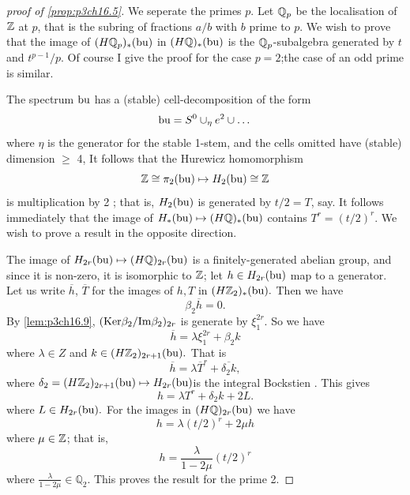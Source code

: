 \documentclass[../main]{subfiles}
\begin{document}
\begin{proof}[proof of \ref{prop:p3ch16.5}] We seperate the primes $p$. Let $\mathbb{Q}_p$ be the localisation of $\mathbb{Z}$ at $p$, that is the subring of fractions $a/b$ with $b$ prime to $p$. We wish to prove that the image of $(H\mathbb{Q}_{p})_{\ast}(\mathrm{bu})$ in $(H\mathbb{Q})_{\ast}(\mathrm{bu})$ is the $\mathbb{Q}_{p}$-subalgebra generated by $t$ and $t^{p-1}/p$. Of course I give the proof for the case $p=2$;the case of an odd prime is similar.

The spectrum $\mathrm{bu}$ has a (stable) cell-decomposition of the form \begin{equation*}
    \mathrm{bu}=S^{0}\cup_{\eta}e^{2}\cup\dots
\end{equation*}
where $\eta$ is the generator for the stable 1-stem, and the cells omitted have (stable) dimension $\geq$ 4, It follows that the Hurewicz homomorphism \begin{equation*}
    \mathbb{Z} \cong \pi_{2}(\mathrm{bu}) \mapsto H_{2}(\mathrm{bu}) \cong \mathbb{Z}
\end{equation*}
is multiplication by 2 ; that is, $H_{2}(\mathrm{bu})$ is generated by $t/2=T$, say. It follows immediately that the image of $H_{\ast}(\mathrm{bu}) \mapsto (H\mathbb{Q})_{\ast}(\mathrm{bu})$ contains $T^{r}=(t/2)^{r}.$ We wish to prove a result in the opposite direction.

The image of $H_{2r}(\mathrm{bu})\mapsto (H\mathbb{Q})_{2r}(\mathrm{bu})$ is a finitely-generated abelian group, and since it is non-zero, it is isomorphic to $\mathbb{Z}$; let $h\in H_{2r}(\mathrm{bu}) $ map to a generator. Let us write $\overline{h}$, $\overline{T}$ for the images of $h, T$ in $(H\mathbb{Z}_2)_{\ast}(\mathrm{bu}).$ Then we have \begin{equation*}
    \beta_{2}\overline{h}=0 .
\end{equation*}
By \ref{lem:p3ch16.9}, $(\mathrm{Ker}\beta_{2}/\mathrm{Im}\beta_{2})_{2r}$ is generate by $\xi_{1}^{2r}$. So we have \begin{equation*}
    \overline{h}= \lambda \xi_{1}^{2r}+\beta_{2}k
\end{equation*}
where $\lambda \in Z$ and $k\in (H\mathbb{Z}_2)_{2r+1}(\mathrm{bu}).$ That is \begin{equation*}
    \overline{h}= \lambda\overline{T}^{r}+\overline{\delta_{2}k}, 
\end{equation*}
where  $\delta_{2}=(H\mathbb{Z}_2)_{2r+1}(\mathrm{bu})\mapsto H_{2r}(\mathrm{bu})$is the integral Bockstien . This gives \begin{equation*}
    h=\lambda T^r+\delta_2k+2L.
\end{equation*}
where $L\in H_{2r}(\mathrm{bu}).$ For the images in $(H\mathbb{Q})_{2r}(\mathrm{bu})$ we have \begin{equation*}
    h=\lambda(t/2)^{r}+2\mu h
\end{equation*}
where $\mu \in \mathbb{Z}$; that is, \begin{equation*}
    h=\frac{\lambda}{1-2\mu}(t/2)^{r}
\end{equation*}
where $\frac{\lambda}{1-2\mu}\in \mathbb{Q}_{2}$. This proves the result for the prime 2. 
\end{proof}
\end{document}
